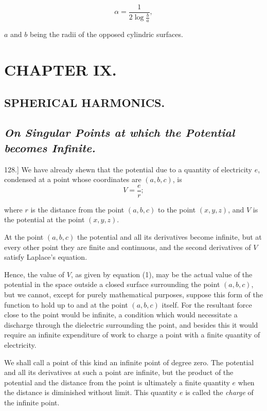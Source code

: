 \documentclass[11pt,a4paper]{article}
\begin{document}
\[
\alpha=\frac{1}{2\log\frac{b}{a}},
\]

$a$ and $b$ being the radii of the opposed cylindric surfaces.

\section*{CHAPTER IX.}

\subsection*{SPHERICAL HARMONICS.}

\subsection*{\textit{On Singular Points at which the Potential becomes Infinite.}}

128.] We have already shewn that the potential due to a quantity of electricity $e$, condensed at a point whose coordinates are $(a,b,c)$, is
\begin{equation}\tag{1}
V=\frac{e}{r};
\end{equation}

where $r$ is the distance from the point $(a,b,c)$ to the point $(x,y,z)$, and $V$ is the potential at the point $(x,y,z)$.

At the point $(a,b,c)$ the potential and all its derivatives become infinite, but at every other point they are finite and continuous, and the second derivatives of $V$ satisfy Laplace's equation.

Hence, the value of $V$, as given by equation (1), may be the actual value of the potential in the space outside a closed surface surrounding the point $(a,b,c)$, but we cannot, except for purely mathematical purposes, suppose this form of the function to hold up to and at the point $(a,b,c)$ itself. For the resultant force close to the point would be infinite, a condition which would necessitate a discharge through the dielectric surrounding the point, and besides this it would require an infinite expenditure of work to charge a point with a finite quantity of electricity.

We shall call a point of this kind an infinite point of degree zero. The potential and all its derivatives at such a point are infinite, but the product of the potential and the distance from the point is ultimately a finite quantity $e$ when the distance is diminished without limit. This quantity $e$ is called the \emph{charge} of the infinite point.
\end{document}
